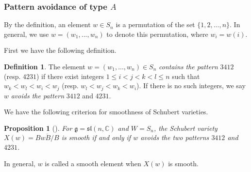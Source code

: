 \documentclass[11pt, reqno]{amsart}
\newtheorem{prop}[Thm]{Proposition}
\theoremstyle{definition}
\newtheorem{dfn}[Thm]{Definition}
\numberwithin{equation}{section}
\begin{document}




\subsubsection{Pattern avoidance of type $A$}



By the definition, an element $w\in S_n$ is a permutation of the set $\{1,2,...,n\}$. In general, we use $w=(w_1,...,w_n)$ to denote this permutation, where $w_i=w(i)$.

First we have the following definition.

\begin{dfn}
	The element $w = (w_1, ..., w_n)\in S_n$ {\it contains the pattern} $3412$
	 (resp. $4231$) if there exist integers $1\leq i < j < k < l\leq n$ such that
	$w_k < w_l < w_i < w_j $ (resp. $ w_l < w_j < w_k < w_i$).
	 If there is no such integers, we say $w$ {\it avoids the pattern } $3412$ and $4231$.
\end{dfn}


We have the following criterion for smoothness of Schubert varieties.


\begin{prop}[\cite{LS-90}]\label{3412}
	For $\mathfrak{g}=\mathfrak{sl}(n, \mathbb{C})$ and $ W=S_n$,  the Schubert variety $X(w)=\overline{BwB/B}$ is smooth if and only if
	$ w$ avoids the two patterns $3412$ and $4231$.
\end{prop}

In general, $w$ is called a smooth element when $X(w)$ is smooth. 
\end{document}
